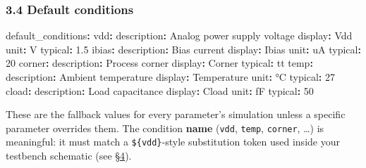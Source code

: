 \documentclass[
]{article}
\newenvironment{Shaded}{}{}
\newcommand{\AttributeTok}[1]{\textcolor[rgb]{0.49,0.56,0.16}{#1}}
\newcommand{\DecValTok}[1]{\textcolor[rgb]{0.25,0.63,0.44}{#1}}
\newcommand{\FloatTok}[1]{\textcolor[rgb]{0.25,0.63,0.44}{#1}}
\newcommand{\FunctionTok}[1]{\textcolor[rgb]{0.02,0.16,0.49}{#1}}
\newcommand{\KeywordTok}[1]{\textcolor[rgb]{0.00,0.44,0.13}{\textbf{#1}}}
\begin{document}
\hypertarget{default-conditions}{%
\subsubsection{3.4 Default conditions}\label{default-conditions}}

\begin{Shaded}
\begin{Highlighting}[]
\FunctionTok{default\_conditions}\KeywordTok{:}
\AttributeTok{  }\FunctionTok{vdd}\KeywordTok{:}
\AttributeTok{    }\FunctionTok{description}\KeywordTok{:}\AttributeTok{ Analog power supply voltage}
\AttributeTok{    }\FunctionTok{display}\KeywordTok{:}\AttributeTok{ Vdd}
\AttributeTok{    }\FunctionTok{unit}\KeywordTok{:}\AttributeTok{ V}
\AttributeTok{    }\FunctionTok{typical}\KeywordTok{:}\AttributeTok{ }\FloatTok{1.5}
\AttributeTok{  }\FunctionTok{ibias}\KeywordTok{:}
\AttributeTok{    }\FunctionTok{description}\KeywordTok{:}\AttributeTok{ Bias current}
\AttributeTok{    }\FunctionTok{display}\KeywordTok{:}\AttributeTok{ Ibias}
\AttributeTok{    }\FunctionTok{unit}\KeywordTok{:}\AttributeTok{ uA}
\AttributeTok{    }\FunctionTok{typical}\KeywordTok{:}\AttributeTok{ }\DecValTok{20}
\AttributeTok{  }\FunctionTok{corner}\KeywordTok{:}
\AttributeTok{    }\FunctionTok{description}\KeywordTok{:}\AttributeTok{ Process corner}
\AttributeTok{    }\FunctionTok{display}\KeywordTok{:}\AttributeTok{ Corner}
\AttributeTok{    }\FunctionTok{typical}\KeywordTok{:}\AttributeTok{ tt}
\AttributeTok{  }\FunctionTok{temp}\KeywordTok{:}
\AttributeTok{    }\FunctionTok{description}\KeywordTok{:}\AttributeTok{ Ambient temperature}
\AttributeTok{    }\FunctionTok{display}\KeywordTok{:}\AttributeTok{ Temperature}
\AttributeTok{    }\FunctionTok{unit}\KeywordTok{:}\AttributeTok{ °C}
\AttributeTok{    }\FunctionTok{typical}\KeywordTok{:}\AttributeTok{ }\DecValTok{27}
\AttributeTok{  }\FunctionTok{cload}\KeywordTok{:}
\AttributeTok{    }\FunctionTok{description}\KeywordTok{:}\AttributeTok{ Load capacitance}
\AttributeTok{    }\FunctionTok{display}\KeywordTok{:}\AttributeTok{ Cload}
\AttributeTok{    }\FunctionTok{unit}\KeywordTok{:}\AttributeTok{ fF}
\AttributeTok{    }\FunctionTok{typical}\KeywordTok{:}\AttributeTok{ }\DecValTok{50}
\end{Highlighting}
\end{Shaded}

These are the fallback values for every parameter's simulation unless a
specific parameter overrides them. The condition \textbf{name}
(\texttt{vdd}, \texttt{temp}, \texttt{corner}, \ldots) is meaningful: it
must match a \texttt{\$\{vdd\}}-style substitution token used inside
your testbench schematic (see
\protect\hyperlink{4-testbench-templates-and-token-substitution}{§4}).
\end{document}

